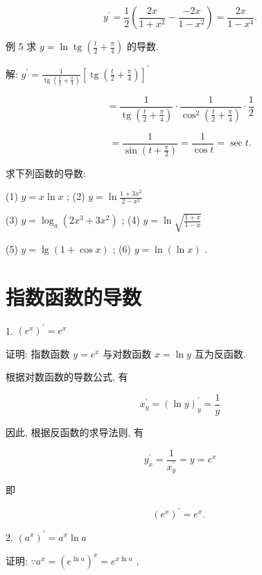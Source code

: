 \documentclass[lang=cn,newtx,12pt,scheme=chinese]{elegantbook}
\begin{document}
\[
{y}^{\prime } = \frac{1}{2}\left( {\frac{2x}{1 + {x}^{2}} - \frac{-{2x}}{1 - {x}^{2}}}\right) = \frac{2x}{1 - {x}^{4}}.
\]

例 5 求 \(y = \ln \operatorname{tg}\left( {\frac{t}{2} + \frac{\pi }{4}}\right)\) 的导数.

解: \({y}^{\prime } = \frac{1}{\operatorname{tg}\left( {\frac{t}{2} + \frac{\pi }{4}}\right) }{\left\lbrack \operatorname{tg}\left( \frac{t}{2} + \frac{\pi }{4}\right) \right\rbrack }^{\prime }\)

\[
= \frac{1}{\operatorname{tg}\left( {\frac{t}{2} + \frac{\pi }{4}}\right) } \cdot \frac{1}{{\cos }^{2}\left( {\frac{t}{2} + \frac{\pi }{4}}\right) } \cdot \frac{1}{2}
\]

\[
= \frac{1}{\sin \left( {t + \frac{\pi }{2}}\right) } = \frac{1}{\cos t} = \sec t.
\]

\begin{problemset}[练习]

\item 求下列函数的导数:

(1) \(y = x\ln x\) ; (2) \(y = \ln \frac{1 + 3{x}^{2}}{2 - {x}^{2}}\)

(3) \(y = {\log }_{a}\left( {2{x}^{3} + 3{x}^{2}}\right)\) ; (4) \(y = \ln \sqrt{\frac{1 + x}{1 - x}}\)

(5) \(y = \lg \left( {1 + \cos x}\right)\) ; (6) \(y = \ln \left( {\ln x}\right)\) .

\end{problemset}

\section{指数函数的导数}
\begin{conclusion}
	1. \({\left( {e}^{x}\right) }^{\prime } = {e}^{x}\)
\end{conclusion}

证明: 指数函数 \(y = {e}^{x}\) 与对数函数 \(x = \ln y\) 互为反函数.

根据对数函数的导数公式, 有

\[
{x}_{y}^{\prime } = {\left( \ln y\right) }_{y}^{\prime } = \frac{1}{y}
\]

因此, 根据反函数的求导法则, 有

\[
{y}_{x}^{\prime } = \frac{1}{{x}_{y}^{\prime }} = y = {e}^{x}
\]

即

\[
{\left( {e}^{x}\right) }^{\prime } = {e}^{x}\text{. }
\]

\begin{conclusion}
	2. \({\left( {a}^{x}\right) }^{\prime } = {a}^{x}\ln a\)
\end{conclusion}
证明: \(\because {a}^{x} = {\left( {e}^{\ln a}\right) }^{x} = {e}^{x\ln a}\) ,
\end{document}
